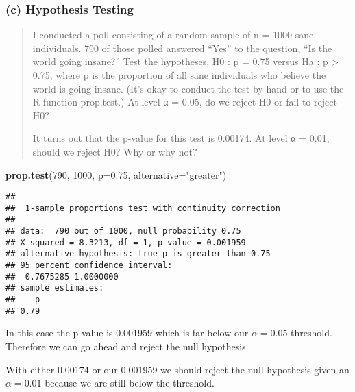 \documentclass[
]{article}
\newenvironment{Shaded}{\begin{snugshade}}{\end{snugshade}}
\newcommand{\DataTypeTok}[1]{\textcolor[rgb]{0.13,0.29,0.53}{#1}}
\newcommand{\DecValTok}[1]{\textcolor[rgb]{0.00,0.00,0.81}{#1}}
\newcommand{\FloatTok}[1]{\textcolor[rgb]{0.00,0.00,0.81}{#1}}
\newcommand{\KeywordTok}[1]{\textcolor[rgb]{0.13,0.29,0.53}{\textbf{#1}}}
\newcommand{\NormalTok}[1]{#1}
\newcommand{\StringTok}[1]{\textcolor[rgb]{0.31,0.60,0.02}{#1}}
\begin{document}
\hypertarget{c-hypothesis-testing}{%
\subsubsection{(c) Hypothesis Testing}\label{c-hypothesis-testing}}

\begin{quote}
I conducted a poll consisting of a random sample of n = 1000 sane
individuals. 790 of those polled answered ``Yes'' to the question, ``Is
the world going insane?'' Test the hypotheses, H0 : p = 0.75 versus Ha :
p \textgreater{} 0.75, where p is the proportion of all sane individuals
who believe the world is going insane. (It's okay to conduct the test by
hand or to use the R function prop.test.) At level α = 0.05, do we
reject H0 or fail to reject H0?

It turns out that the p-value for this test is 0.00174. At level α =
0.01, should we reject H0? Why or why not?
\end{quote}

\begin{Shaded}
\begin{Highlighting}[]
\KeywordTok{prop.test}\NormalTok{(}\DecValTok{790}\NormalTok{, }\DecValTok{1000}\NormalTok{, }\DataTypeTok{p=}\FloatTok{0.75}\NormalTok{, }\DataTypeTok{alternative=}\StringTok{"greater"}\NormalTok{)}
\end{Highlighting}
\end{Shaded}

\begin{verbatim}
## 
##  1-sample proportions test with continuity correction
## 
## data:  790 out of 1000, null probability 0.75
## X-squared = 8.3213, df = 1, p-value = 0.001959
## alternative hypothesis: true p is greater than 0.75
## 95 percent confidence interval:
##  0.7675285 1.0000000
## sample estimates:
##    p 
## 0.79
\end{verbatim}

In this case the p-value is 0.001959 which is far below our
\(\alpha=0.05\) threshold. Therefore we can go ahead and reject the null
hypothesis.

With either 0.00174 or our 0.001959 we should reject the null hypothesis
given an \(\alpha=0.01\) because we are still below the threshold.
\end{document}
